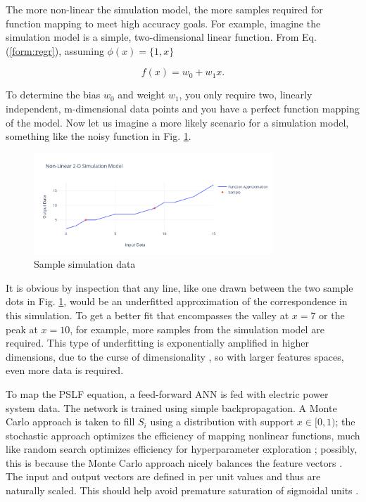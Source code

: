 \documentclass[conference]{IEEEtran}
\begin{document}
The more non-linear the simulation model, the more samples required for function mapping to meet high accuracy goals. For example, imagine the simulation model is a simple, two-dimensional linear function. From Eq. (\ref{form:regr}), assuming $\phi(x) = \{1, x\}$

\begin{equation} f(x) = w_{0} + w_{1} x. \label{form: line} \end{equation}

To determine the bias $w_{0}$ and weight $w_{1}$, you only require two, linearly independent, m-dimensional data points and you have a perfect function mapping of the model. Now let us imagine a more likely scenario for a simulation model,  something like the noisy function in Fig. \ref{fig:simdata}.

\setcounter{figure}{1} %
\begin{figure}[H]
	\centering
	\includegraphics[width=9cm]{simdata.pdf}
	\caption{Sample simulation data}
	\label{fig:simdata}
\end{figure}

It is obvious by inspection that any line, like one drawn between the two sample dots in Fig. \ref{fig:simdata}, would be an underfitted approximation of the correspondence in this simulation. To get a better fit that encompasses the valley at $x = 7$ or the peak at $x  =10$, for example, more samples from the simulation model are required. This type of underfitting is exponentially amplified in higher dimensions, due to the curse of dimensionality \cite{geen2011}, so with larger features spaces, even more data is required.

To map the PSLF equation, a feed-forward ANN is fed with electric power system data. The network is trained using simple backpropagation. A Monte Carlo approach is taken to fill $S_{i}$ using a distribution with support $x \in [0, 1)$; the stochastic approach optimizes the efficiency of mapping nonlinear functions, much like random search optimizes efficiency for hyperparameter exploration \cite{berg2012}; possibly, this is because the Monte Carlo approach nicely balances the feature vectors \cite{kraw2016}. The input and output vectors are defined in per unit values and thus are naturally scaled. This should help avoid premature saturation of sigmoidal units \cite{khom2007}.
\end{document}
